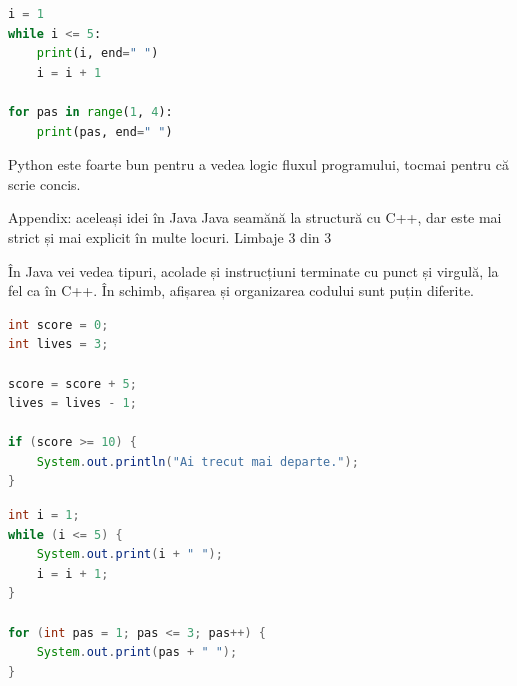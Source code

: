 \begin{examplebox}
\begin{lstlisting}[style=languagequest,language=Python]
i = 1
while i <= 5:
    print(i, end=" ")
    i = i + 1

for pas in range(1, 4):
    print(pas, end=" ")
\end{lstlisting}
\end{examplebox}

\begin{languagebox}[Ne amintim]
Python este foarte bun pentru a vedea logic fluxul programului, tocmai pentru că scrie concis.
\end{languagebox}

\clearpage

\PageHeader
  {Appendix: aceleași idei în Java}
  {Java seamănă la structură cu C++, dar este mai strict și mai explicit în multe locuri.}
  {Limbaje 3 din 3}

\begin{languagebox}[Ce să observi]
În Java vei vedea tipuri, acolade și instrucțiuni terminate cu punct și virgulă, la fel ca în C++. În schimb, afișarea și organizarea codului sunt puțin diferite.
\end{languagebox}

\begin{examplebox}
\begin{lstlisting}[style=languagequest,language=Java]
int score = 0;
int lives = 3;

score = score + 5;
lives = lives - 1;

if (score >= 10) {
    System.out.println("Ai trecut mai departe.");
}
\end{lstlisting}
\end{examplebox}

\begin{examplebox}
\begin{lstlisting}[style=languagequest,language=Java]
int i = 1;
while (i <= 5) {
    System.out.print(i + " ");
    i = i + 1;
}

for (int pas = 1; pas <= 3; pas++) {
    System.out.print(pas + " ");
}
\end{lstlisting}
\end{examplebox}

\clearpage
